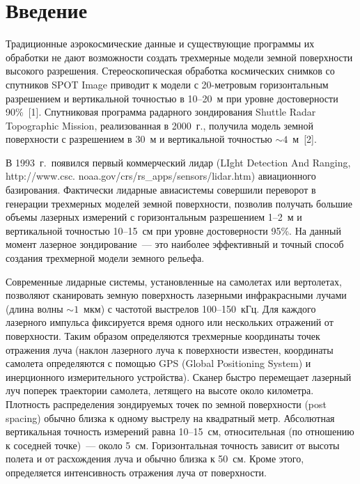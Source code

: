       \begin{multicols}{2}

      \label{st\stat}
   
   
\section{Введение}

   Традиционные аэрокосмические данные и существующие программы их 
обработки не дают возможности создать трехмерные модели земной\linebreak 
поверхности высокого разрешения. Стереоскопическая обработка космических 
снимков со спутников SPOT Image приводит к модели с 20-метровым 
горизонтальным разрешением и вертикальной точ\-ностью в 10--20~м при 
уровне достоверности 90\%~[1]. Спутниковая программа радарного 
зондирования Shuttle Radar Topographic Mission, реализованная в 2000~г., 
получила модель земной поверхности с разрешением в 30~м и вертикальной 
точностью $\sim  4$~м~[2].
   
   В 1993~г.\ появился первый коммерческий лидар (LIght Detection And 
Ranging, {\sf http://www.csc. noaa.gov/crs/rs\_apps/sensors/lidar.htm)} 
авиационного базирования. Фактически лидарные авиасистемы совершили 
переворот в генерации трехмерных моделей земной поверхности, позволив 
получать большие объемы лазерных измерений с горизонтальным разрешением 
1--2~м и вертикальной точностью 10--15~см при уровне достоверности 
95\%. На данный момент лазерное зондирование~--- это наиболее эффективный 
и точный способ создания трехмерной модели земного рельефа.
   
   Современные лидарные системы, установленные на самолетах или 
вертолетах, позволяют\linebreak
 сканировать земную поверхность лазерными 
инфракрасными лучами (длина волны $\sim  1$~мкм) с час\-то\-той выстрелов 
   100--150~кГц. Для каждого лазерного импульса фиксируется время одного 
или нескольких отражений от поверхности. Таким образом определяются 
трехмерные координаты точек отражения луча (наклон лазерного луча к 
по\-верх\-ности известен, координаты самолета определяются с помощью 
GPS (Global Positioning System) и инерционного измерительного устройства). Сканер быст\-ро 
перемещает лазерный луч поперек траектории самолета, летящего на высоте 
около километра. Плотность распределения зондируемых точек по земной 
поверхности (post spacing) обычно близка к одному выстрелу на квад\-рат\-ный метр. 
Абсолютная вертикальная точность измерений равна 10--15~см, относительная 
(по отношению к соседней точке)~--- около 5~см. Горизонтальная точность 
зависит от высоты полета и от расхождения луча и обычно близка к 50~см. 
Кроме этого, определяется интенсивность отражения луча от поверхности. 


\end{multicols}
